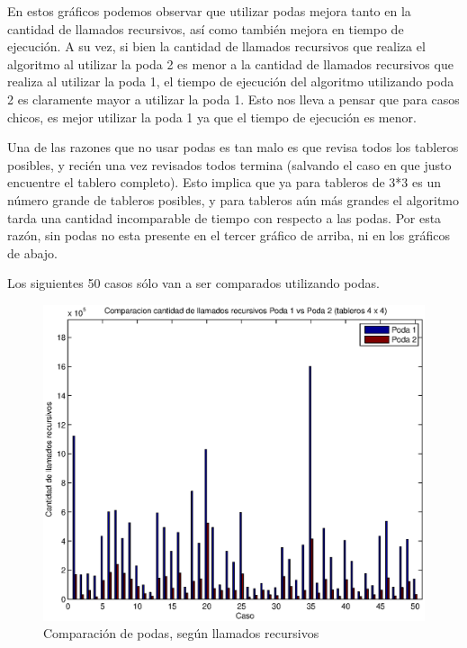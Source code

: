En estos gráficos podemos observar que utilizar podas mejora tanto en la cantidad de llamados recursivos, así como también mejora en tiempo de ejecución. A su vez, si bien la cantidad de llamados recursivos que realiza el algoritmo al utilizar la poda 2 es menor a la cantidad de llamados recursivos que realiza al utilizar la poda 1, el tiempo de ejecución del algoritmo utilizando poda 2 es claramente mayor a utilizar la poda 1. Esto nos lleva a pensar que para casos chicos, es mejor utilizar la poda 1 ya que el tiempo de ejecución es menor.

Una de las razones que no usar podas es tan malo es que revisa todos los tableros posibles, y recién una vez revisados todos termina (salvando el caso en que justo encuentre el tablero completo). Esto implica que ya para tableros de 3*3 es un número grande de tableros posibles, y para tableros aún más grandes el algoritmo tarda una cantidad incomparable de tiempo con respecto a las podas. Por esta razón, sin podas no esta presente en el tercer gráfico de arriba, ni en los gráficos de abajo.

Los siguientes 50 casos sólo van a ser comparados utilizando podas.

\begin{center}
  \begin{figure}[H]
    \includegraphics[width=\linewidth]{problema3/graficos/comparacion_podas1y2_llamados_recursivos.eps}
    \caption{Comparación de podas, según llamados recursivos}
    \label{fig:problema3-podas-llamados}
  \end{figure}
\end{center}

